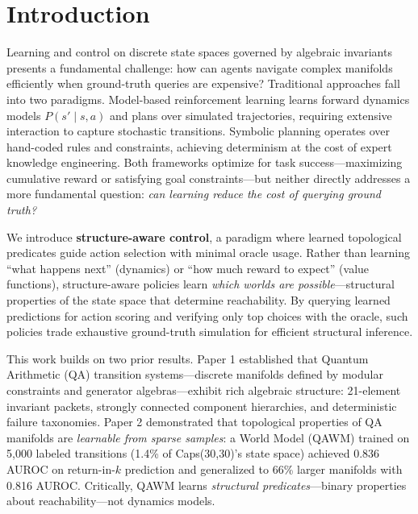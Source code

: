 
\section{Introduction}

Learning and control on discrete state spaces governed by algebraic invariants presents a fundamental challenge: how can agents navigate complex manifolds efficiently when ground-truth queries are expensive? Traditional approaches fall into two paradigms. Model-based reinforcement learning learns forward dynamics models $P(s' \mid s, a)$ and plans over simulated trajectories, requiring extensive interaction to capture stochastic transitions. Symbolic planning operates over hand-coded rules and constraints, achieving determinism at the cost of expert knowledge engineering. Both frameworks optimize for task success—maximizing cumulative reward or satisfying goal constraints—but neither directly addresses a more fundamental question: \textit{can learning reduce the cost of querying ground truth?}

We introduce \textbf{structure-aware control}, a paradigm where learned topological predicates guide action selection with minimal oracle usage. Rather than learning ``what happens next'' (dynamics) or ``how much reward to expect'' (value functions), structure-aware policies learn \textit{which worlds are possible}—structural properties of the state space that determine reachability. By querying learned predictions for action scoring and verifying only top choices with the oracle, such policies trade exhaustive ground-truth simulation for efficient structural inference.

This work builds on two prior results. Paper 1 established that Quantum Arithmetic (QA) transition systems—discrete manifolds defined by modular constraints and generator algebras—exhibit rich algebraic structure: 21-element invariant packets, strongly connected component hierarchies, and deterministic failure taxonomies. Paper 2 demonstrated that topological properties of QA manifolds are \textit{learnable from sparse samples}: a World Model (QAWM) trained on 5,000 labeled transitions (1.4\% of Caps(30,30)'s state space) achieved 0.836 AUROC on return-in-$k$ prediction and generalized to 66\% larger manifolds with 0.816 AUROC. Critically, QAWM learns \textit{structural predicates}—binary properties about reachability—not dynamics models.

